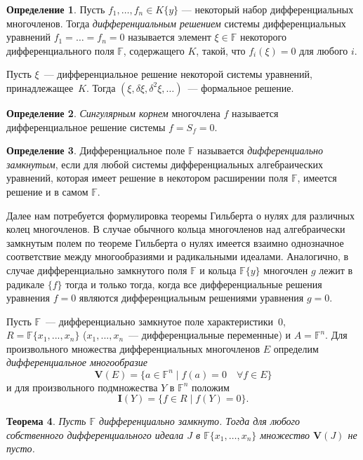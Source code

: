 \documentclass[16pt]{article}
\theoremstyle{plain}
\newtheorem{theorem}{Теорема}
\theoremstyle{definition}
\newtheorem{definition}[theorem]{Определение}
\theoremstyle{remark}
\begin{document}
\begin{definition}
Пусть $f_1,\ldots,f_n\in K\{y\}$ --- некоторый
набор дифференциальных многочленов. Тогда \emph{дифференциальным
решением} системы дифференциальных уравнений $f_1=\ldots =f_n=0$
называется элемент $\xi \in \mathbb{F}$ некоторого дифференциального
поля $\mathbb{F}$, содержащего $K$, такой, что $ f_i(\xi)=0$ для
любого $i$.
\end{definition}

Пусть $\xi$~--- дифференциальное решение некоторой системы уравнений, принадлежащее~$K$.
Тогда $(\xi, \delta \xi, \delta^2 \xi, \ldots)$~--- формальное решение.

\begin{definition} \emph{Сингулярным корнем} многочлена $f$
называется дифференциальное решение системы $f=S_f=0$.
\end{definition}

\begin{definition} Дифференциальное поле $\mathbb{F}$ называется
\emph{дифференциально замкнутым}, если для любой системы дифференциальных алгебраических
уравнений, которая имеет решение в некотором расширении поля $\mathbb{F}$,
имеется решение и в самом $\mathbb{F}$.
\end{definition}

Далее нам потребуется формулировка теоремы Гильберта о нулях для
различных колец многочленов.
В случае обычного кольца многочленов над алгебраически
замкнутым полем по теореме Гильберта о нулях
имеется взаимно однозначное соответствие между многообразиями и радикальными идеалами.
Аналогично, в случае дифференциально
замкнутого поля $\mathbb{F}$ и кольца $\mathbb{F}\{y\}$ многочлен $g$ лежит в
радикале $\{f\}$ тогда и только тогда, когда все дифференциальные
решения уравнения $f=0$ являются дифференциальным решениями уравнения $g=0$.

Пусть $\mathbb{F}$~--- дифференциально замкнутое поле характеристики~$0$,
$R=\mathbb{F}\{x_1,...,x_n\}$ ($x_1,...,x_n$~--- дифференциальные
переменные) и $A=\mathbb{F}^n$. Для произвольного множества
дифференциальных многочленов $E$ определим \emph{дифференциальное многообразие}
$$
\mathbf{V}(E)=\{a\in \mathbb{F}^n \mid f(a)=0\quad\forall  f\in E\}
$$
и для произвольного подмножества $Y$ в $\mathbb{F}^n$ положим
$$
\mathbf{I}(Y)=\{f \in R \mid f(Y)=0\}.
$$

\begin{theorem}\label{theorem:th 0 for dif}
Пусть $\mathbb{F}$ дифференциально замкнуто. Тогда для любого собственного дифференциального идеала $J$ в
$\mathbb{F}\{x_1,\ldots,x_n\}$ множество $\mathbf{V}(J)$ не пусто. \cite[Chapter~IV,
Section~2, Theorem~1]{Kolchin 2}
\end{theorem}
\end{document}
